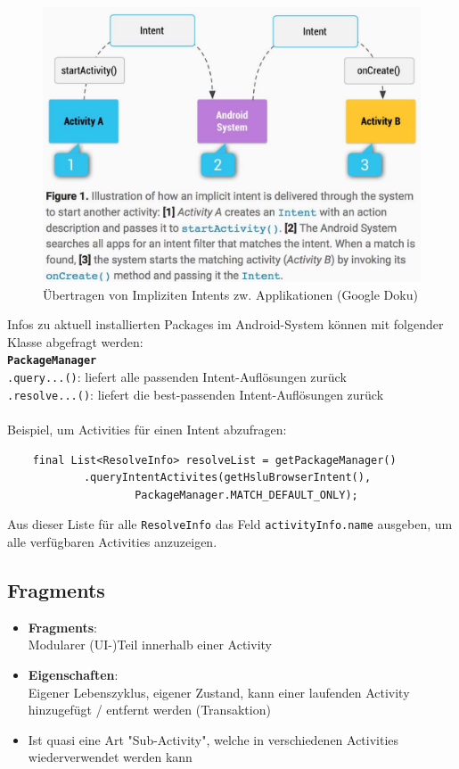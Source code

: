 \documentclass[a4paper]{article}
\begin{document}
		\begin{figure}[!htb]
			\centering
			\includegraphics[width=.65\textwidth]{img/android6/intents_implizit.jpg}
			\caption{Übertragen von Impliziten Intents zw. Applikationen (Google Doku)}
			\label{fig:implicit_intents}
		\end{figure}
		\noindent
		Infos zu aktuell installierten Packages im Android-System können mit folgender Klasse abgefragt werden:\\
		\textbf{\texttt{PackageManager}}\\
		\quad \texttt{.query...()}: liefert alle passenden Intent-Auflösungen zurück\\
		\quad \texttt{.resolve...()}: liefert die best-passenden Intent-Auflösungen zurück\\
		\\
		Beispiel, um Activities für einen Intent abzufragen:
		\begin{lstlisting}
	final List<ResolveInfo> resolveList = getPackageManager()
			.queryIntentActivites(getHsluBrowserIntent(),
					PackageManager.MATCH_DEFAULT_ONLY);
		\end{lstlisting}
		Aus dieser Liste für alle \texttt{ResolveInfo} das Feld \texttt{activityInfo.name} ausgeben, um alle verfügbaren Activities anzuzeigen.
	
	\newpage
	
	\subsection{Fragments}
	
	\begin{itemize}
		\item \textbf{Fragments}:\\
				Modularer (UI-)Teil innerhalb einer Activity
		\item \textbf{Eigenschaften}:\\
				Eigener Lebenszyklus, eigener Zustand, kann einer laufenden Activity hinzugefügt / entfernt werden (Transaktion)
		\item Ist quasi eine Art "Sub-Activity", welche in verschiedenen Activities wiederverwendet werden kann
	\end{itemize}
\end{document}
